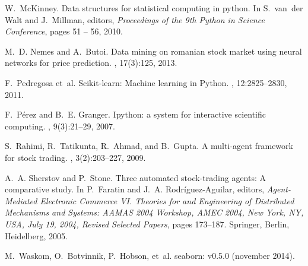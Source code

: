 \documentclass{aamas2017-extabs}
\begin{document}
\begin{thebibliography}{10}
W.~McKinney.
\newblock Data structures for statistical computing in python.
\newblock In S.~van~der Walt and J.~Millman, editors, {\em Proceedings of the
  9th Python in Science Conference}, pages 51 -- 56, 2010.

M.~D. Nemes and A.~Butoi.
\newblock Data mining on romanian stock market using neural networks for price
  prediction.
, 17(3):125, 2013.

F.~Pedregosa et~al.
\newblock Scikit-learn: Machine learning in {P}ython.
, 12:2825--2830, 2011.

F.~P{\'e}rez and B.~E. Granger.
\newblock Ipython: a system for interactive scientific computing.
, 9(3):21--29, 2007.

S.~Rahimi, R.~Tatikunta, R.~Ahmad, and B.~Gupta.
\newblock A multi-agent framework for stock trading.
, 3(2):203--227, 2009.

A.~A. Sherstov and P.~Stone.
\newblock Three automated stock-trading agents: A comparative study.
\newblock In P.~Faratin and J.~A. Rodr{\'i}guez-Aguilar, editors, {\em
  Agent-Mediated Electronic Commerce VI. Theories for and Engineering of
  Distributed Mechanisms and Systems: AAMAS 2004 Workshop, AMEC 2004, New York,
  NY, USA, July 19, 2004, Revised Selected Papers}, pages 173--187. Springer,
  Berlin, Heidelberg, 2005.

M.~Waskom, O.~Botvinnik, P.~Hobson, et~al.
\newblock seaborn: v0.5.0 (november 2014).

\end{thebibliography}
\end{document}
